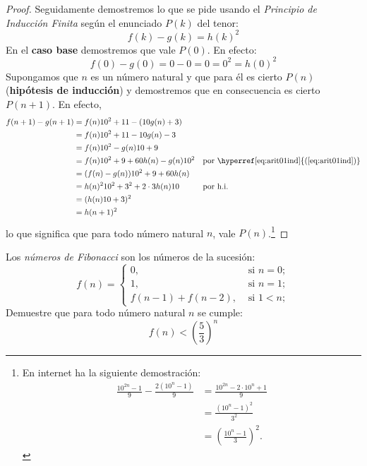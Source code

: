 \begin{proof}
  Seguidamente demostremos lo que se pide usando el \textit{Principio
    de Inducción Finita} según el enunciado $P(k)$ del tenor:
    \begin{equation*}
      f(k)-g(k)=h(k)^{2}
    \end{equation*}
    En el \textbf{caso base} demostremos que vale $P(0)$. En efecto:
    \begin{equation*}
      f(0)-g(0)=0-0=0=0^{2}=h(0)^{2}
    \end{equation*}
    Supongamos que $n$ es un número natural y que para él es cierto
    $P(n)$ (\textbf{hipótesis de inducción}) y demostremos que en
    consecuencia es cierto $P(n+1)$. En efecto,
    \begin{align*}
      f(n+1)-g(n+1)&=f(n)10^{2}+11-(10g(n)+3)&&\\
                   &=f(n)10^{2}+11-10g(n)-3&&\\
                   &=f(n)10^{2}-g(n)10+9&&\\
                   &=f(n)10^{2}+9+60h(n)-g(n)10^{2}&&
                          \text{por \hyperref[eq:arit01ind]{(\ref*{eq:arit01ind})}}\\
                   &=(f(n)-g(n))10^{2}+9+60h(n)&&\\
                   &=h(n)^{2}10^{2}+3^{2}+2\cdot3h(n)10&&\text{por
                                                               h.i.}\\
                   &=(h(n)10+3)^{2}&&\\
                   &=h(n+1)^{2}&&
    \end{align*}
    lo que significa que para todo número natural $n$, vale
    $P(n)$.\footnote{En internet ha
      la siguiente demostración:
      \begin{align*}
        \frac{10^{2n}-1}{9}-\frac{2(10^{n}-1)}{9}&=\frac{10^{2n}-2\cdot10^{n}+1}{9}\\
                                                &=\frac{(10^{n}-1)^{2}}{3^{2}}\\
                                                &=\left(\frac{10^{n}-1}{3}\right)^{2}.
      \end{align*}
    }
  \end{proof}

  \begin{exercise}
    \label{00_induc_21}
    Los \textit{números de Fibonacci} son los números de la sucesión:
    \begin{equation*}
      f(n)=
      \begin{cases}
        0,&\text{ si }n=0;\\
        1,&\text{ si }n=1;\\
        f(n-1)+f(n-2),& \text{ si }1<n; 
      \end{cases}
    \end{equation*}
    Demuestre que para todo número natural $n$ se cumple:
    \begin{equation*}
      f(n)<\left(\frac{5}{3}\right)^{n}
    \end{equation*}    
  \end{exercise}

